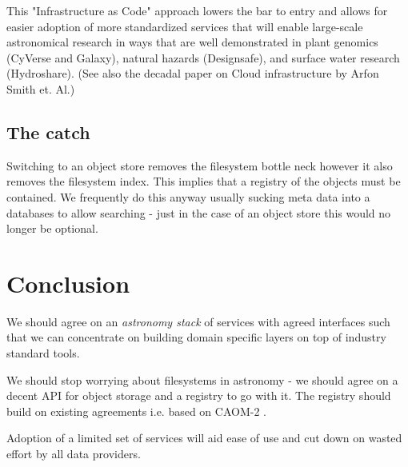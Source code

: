 This "Infrastructure as Code" \citep{morris2016infrastructure} approach lowers the bar to entry
and allows for easier adoption of more standardized services that will enable large-scale
astronomical research in ways that are well demonstrated in plant genomics (CyVerse and Galaxy), natural hazards (Designsafe), and surface water research (Hydroshare). (See also the decadal paper on Cloud infrastructure by Arfon Smith et. Al.)

\subsection{The catch }
Switching to an object store removes the filesystem bottle neck however it also removes the filesystem index. This implies that a registry of the objects must be contained. We frequently do this anyway usually sucking meta data into a databases to allow searching - just in the case of an object store this would no longer be  optional.


\section{Conclusion}
We should agree on an \emph{astronomy \gls{stack}} of services with agreed interfaces such that we can concentrate on building domain specific layers on top of industry standard tools.

We should stop worrying about filesystems in astronomy - we should agree on a decent \gls{API} for object storage and a registry to go with it.
The registry should build on existing agreements i.e. based on \gls{CAOM}-2 \citep{2007ASPC..376..347D}.

Adoption of  a limited set of  services will  aid ease of use and cut down on wasted effort by all data providers.
